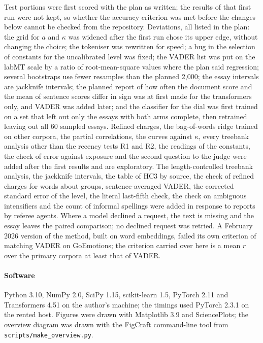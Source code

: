 Test portions were first scored with the plan as written; the results of that first run were not kept, so whether the accuracy criterion was met before the changes below cannot be checked from the repository. Deviations, all listed in the plan: the grid for $a$ and $\kappa$ was widened after the first run chose its upper edge, without changing the choice; the tokeniser was rewritten for speed; a bug in the selection of constants for the uncalibrated level was fixed; the VADER list was put on the labMT scale by a ratio of root-mean-square values where the plan said regression; several bootstraps use fewer resamples than the planned 2,000; the essay intervals are jackknife intervals; the planned report of how often the document score and the mean of sentence scores differ in sign was at first made for the transformers only, and VADER was added later; and the classifier for the dial was first trained on a set that left out only the essays with both arms complete, then retrained leaving out all 60 sampled essays. Refined charges, the bag-of-words ridge trained on other corpora, the partial correlations, the curves against $\kappa$, every treebank analysis other than the recency tests R1 and R2, the readings of the constants, the check of error against exposure and the second question to the judge were added after the first results and are exploratory. The length-controlled treebank analysis, the jackknife intervals, the table of HC3 by source, the check of refined charges for words about groups, sentence-averaged VADER, the corrected standard error of the level, the literal last-fifth check, the check on ambiguous intensifiers and the count of informal spellings were added in response to reports by referee agents. Where a model declined a request, the text is missing and the essay leaves the paired comparison; no declined request was retried. A February 2026 version of the method, built on word embeddings, failed its own criterion of matching VADER on GoEmotions\cite{demszky2020}; the criterion carried over here is a mean $r$ over the primary corpora at least that of VADER.

\paragraph{Software}
Python 3.10, NumPy 2.0, SciPy 1.15, scikit-learn 1.5, PyTorch 2.11 and Transformers 4.51 on the author's machine; the timings used PyTorch 2.3.1 on the rented host. Figures were drawn with Matplotlib 3.9 and SciencePlots\cite{garrett2021}; the overview diagram was drawn with the FigCraft command-line tool from \texttt{scripts/make\_overview.py}.

